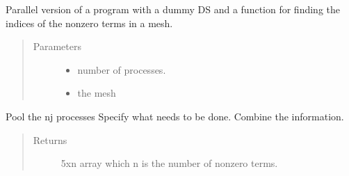 \documentclass[letterpaper,10pt,english]{sphinxmanual}
\begin{document}

\begin{fulllineitems}
\label{\detokenize{index:DictionarySparseMatrix.parnonzero}}
Parallel version of a program with a dummy DS and a function for   finding the indices of the nonzero terms in a mesh.
\begin{quote}\begin{description}
\item[{Parameters}] \leavevmode\begin{itemize}
\item {} 
 \textendash{} number of processes.

\item {} 
 \textendash{} the mesh

\end{itemize}

\end{description}\end{quote}

Pool the nj processes
Specify what needs to be done.
Combine the information.
\begin{quote}\begin{description}
\item[{Returns}] \leavevmode
5xn array which n is the number of nonzero terms.

\end{description}\end{quote}

\end{fulllineitems}

\end{document}
